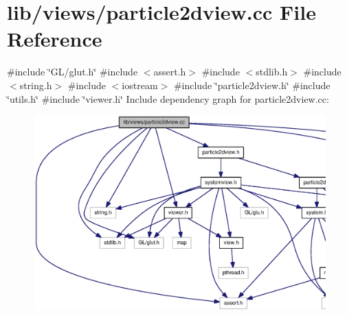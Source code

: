 \section{lib/views/particle2dview.cc \-File \-Reference}
\label{particle2dview_8cc}
{\ttfamily \#include \char`\"{}\-G\-L/glut.\-h\char`\"{}}\*
{\ttfamily \#include $<$assert.\-h$>$}\*
{\ttfamily \#include $<$stdlib.\-h$>$}\*
{\ttfamily \#include $<$string.\-h$>$}\*
{\ttfamily \#include $<$iostream$>$}\*
{\ttfamily \#include \char`\"{}particle2dview.\-h\char`\"{}}\*
{\ttfamily \#include \char`\"{}utils.\-h\char`\"{}}\*
{\ttfamily \#include \char`\"{}viewer.\-h\char`\"{}}\*
\-Include dependency graph for particle2dview.\-cc\-:
\nopagebreak
\begin{figure}[H]
\begin{center}
\leavevmode
\includegraphics[width=350pt]{particle2dview_8cc__incl}
\end{center}
\end{figure}

